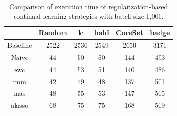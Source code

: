 \begin{table}[h]
    \centering
    \begin{tabular}{c | c c c c c } 
         & Random & \gls{lc} & \gls{bald} & CoreSet & \gls{badge}\\ 
        \hline 
        Baseline & 2522 & 2536 & 2549 & 2650 & 3171 \\
        \hline
        Naive & 44 & 50 & 50 & 144 & 493 \\
        \gls{ewc} & 44 & 53 & 51 & 140 & 486\\
        \gls{imm} & 42 & 49 & 48 & 137 & 501\\
        \gls{mas} & 48 & 55 & 53 & 147 & 505\\
        \gls{alasso} & 68 & 75 & 75 & 168 & 509\\
    \end{tabular}
    \caption{Comparison of execution time of regularization-based continual learning strategies
    with batch size 1,000.}
    \label{fig:Appendix:CAL:1000bTimeTable}
\end{table}


